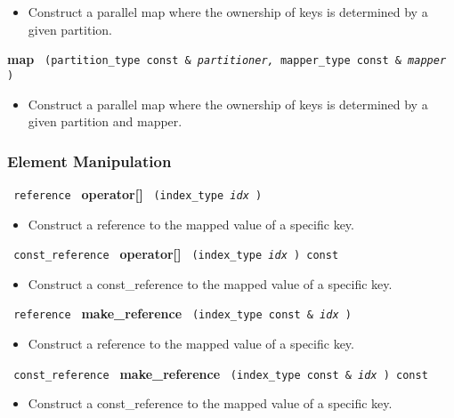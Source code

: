 \begin{itemize}
\item
Construct a parallel map where the ownership of keys is determined by a given partition. 
\end{itemize}
 
\noindent
\textbf{map}%
\texttt{%
(partition\_type const \&
\textit{partitioner,}%
mapper\_type const \&
\textit{mapper}%
)
}

\begin{itemize}
\item
Construct a parallel map where the ownership of keys is determined by a given partition and mapper. 
\end{itemize}

\subsubsection{Element Manipulation}

\noindent
\texttt{%
reference
}
\textbf{operator[]}%
\texttt{%
(index\_type 
\textit{idx}%
)
}

\begin{itemize}
\item
Construct a reference to the mapped value of a specific key.
\end{itemize}
 
\noindent%
\texttt{%
const\_reference
}
\textbf{operator[]}%
\texttt{%
(index\_type 
\textit{idx}%
) const
}

\begin{itemize}
\item
Construct a const\_reference to the mapped value of a specific key.
\end{itemize}
 
\noindent
\texttt{%
reference
}
\textbf{make\_reference}%
\texttt{%
(index\_type const \&
\textit{idx}%
)
}

\begin{itemize}
\item
Construct a reference to the mapped value of a specific key.
\end{itemize}
 
\noindent
\texttt{%
const\_reference
}
\textbf{make\_reference}%
\texttt{%
(index\_type const \&
\textit{idx}%
) const
}

\begin{itemize}
\item
Construct a const\_reference to the mapped value of a specific key.
\end{itemize}
 
